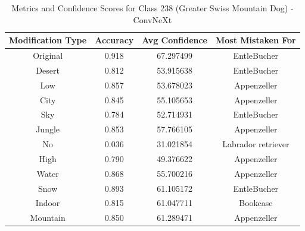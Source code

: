 \begin{table}
	\centering
	\begin{tabular}{|c|c|c|c|}
		\hline
		\textbf{Modification Type} & \textbf{Accuracy} & \textbf{Avg Confidence} & \textbf{Most Mistaken For} \\
		\hline
		Original & 0.918 & 67.297499 & EntleBucher \\
		\hline
		Desert & 0.812 & 53.915638 & EntleBucher \\
		\hline
		Low & 0.857 & 53.678023 & Appenzeller \\
		\hline
		City & 0.845 & 55.105653 & Appenzeller \\
		\hline
		Sky & 0.784 & 52.714931 & EntleBucher \\
		\hline
		Jungle & 0.853 & 57.766105 & Appenzeller \\
		\hline
		No & 0.036 & 31.021854 & Labrador retriever \\
		\hline
		High & 0.790 & 49.376622 & Appenzeller \\
		\hline
		Water & 0.868 & 55.700216 & Appenzeller \\
		\hline
		Snow & 0.893 & 61.105172 & EntleBucher \\
		\hline
		Indoor & 0.815 & 61.047711 & Bookcase \\
		\hline
		Mountain & 0.850 & 61.289471 & Appenzeller \\
		\hline
	\end{tabular}
	\caption{Metrics and Confidence Scores for Class 238 (Greater Swiss Mountain Dog) - ConvNeXt}
	\label{tab:metrics_confidence_class_238_convnext}
\end{table}

